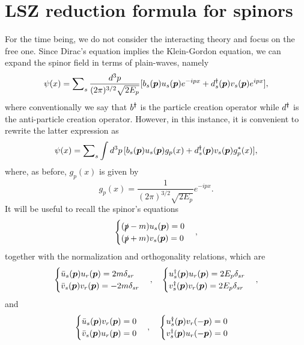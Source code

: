 \section{LSZ reduction formula for spinors}
For the time being, we do not consider the interacting theory and focus on the free one. Since Dirac's equation implies the Klein-Gordon equation, we can expand the spinor field in terms of plain-waves, namely
\begin{equation}
    \psi(x) = \sum\nolimits_s\frac{d^3p}{(2\pi)^{3/2}\sqrt{2E_p}}[b_s(\bm{p})u_s(\bm{p})e^{-ipx} + d_s^\dagger(\bm{p})v_s(\bm{p})e^{ipx}],
\end{equation}
where conventionally we say that $b^\dagger$ is the particle creation operator while $d^\dagger$ is the anti-particle creation operator. However, in this instance, it is convenient to rewrite the latter expression as 
\begin{equation}
    \psi(x) = \sum\nolimits_{s}\int d^3p\,[b_s(\bm{p})u_s(\bm{p})g_p(x) + d^\dagger_s(\bm{p})v_s(\bm{p})g_p^*(x)],
\end{equation}
where, as before, $g_p(x)$ is given by
\begin{equation}
    g_p(x) = \frac{1}{(2\pi)^{3/2}\sqrt{2E_p}}e^{-ipx}.
\end{equation}
It will be useful to recall the spinor's equations 
\begin{equation}
    \begin{cases}
        (\slashed{p} - m)u_s(\bm{p}) = 0 \\
        (\slashed{p} + m)v_s(\bm{p}) = 0
    \end{cases},
\end{equation}
together with the normalization and orthogonality relations, which are
\begin{equation}
    \begin{cases}
        \bar{u}_s(\bm{p})u_r(\bm{p}) = 2m\delta_{sr} \\
        \bar{v}_s(\bm{p})v_r(\bm{p}) = -2m\delta_{sr}
    \end{cases},\quad 
    \begin{cases}
        u^\dagger_s(\bm{p})u_r(\bm{p}) = 2E_p\delta_{sr} \\
        v^\dagger_s(\bm{p})v_r(\bm{p}) = 2E_p\delta_{sr}
    \end{cases},
\end{equation}
and 
\begin{equation}
\label{eq: Dirac's spinors orthogonality relations}
    \begin{cases}
        \bar{u}_s(\bm{p})v_r(\bm{p}) = 0 \\
        \bar{v}_s(\bm{p})u_r(\bm{p}) = 0
    \end{cases},\quad 
    \begin{cases}
        u^\dagger_s(\bm{p})v_r(-\bm{p}) = 0 \\
        v^\dagger_s(\bm{p})u_r(-\bm{p}) = 0
    \end{cases}
\end{equation}
